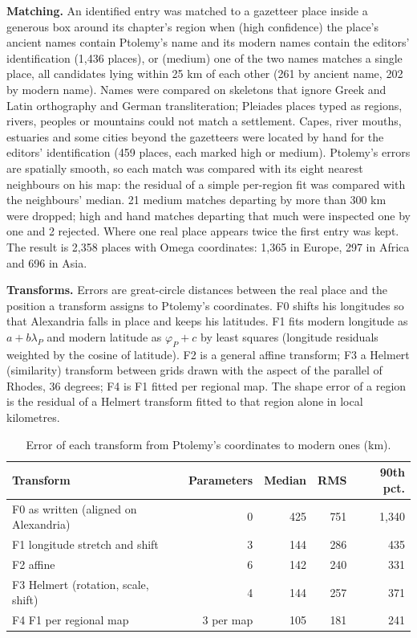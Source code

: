 \documentclass[11pt,a4paper]{article}
\begin{document}
\textbf{Matching.} An identified entry was matched to a gazetteer place inside a generous box around its chapter's region when (high confidence) the place's ancient names contain Ptolemy's name and its modern names contain the editors' identification (1,436 places), or (medium) one of the two names matches a single place, all candidates lying within 25 km of each other (261 by ancient name, 202 by modern name). Names were compared on skeletons that ignore Greek and Latin orthography and German transliteration; Pleiades places typed as regions, rivers, peoples or mountains could not match a settlement. Capes, river mouths, estuaries and some cities beyond the gazetteers were located by hand for the editors' identification (459 places, each marked high or medium). Ptolemy's errors are spatially smooth, so each match was compared with its eight nearest neighbours on his map: the residual of a simple per-region fit was compared with the neighbours' median. 21 medium matches departing by more than 300 km were dropped; high and hand matches departing that much were inspected one by one and 2 rejected. Where one real place appears twice the first entry was kept. The result is 2,358 places with Omega coordinates: 1,365 in Europe, 297 in Africa and 696 in Asia.

\textbf{Transforms.} Errors are great-circle distances between the real place and the position a transform assigns to Ptolemy's coordinates. F0 shifts his longitudes so that Alexandria falls in place and keeps his latitudes. F1 fits modern longitude as $a + b\lambda_P$ and modern latitude as $\varphi_P + c$ by least squares (longitude residuals weighted by the cosine of latitude). F2 is a general affine transform; F3 a Helmert (similarity) transform between grids drawn with the aspect of the parallel of Rhodes, 36 degrees; F4 is F1 fitted per regional map. The shape error of a region is the residual of a Helmert transform fitted to that region alone in local kilometres.

\begin{table}[tbp]\centering\small\caption{Error of each transform from Ptolemy's coordinates to modern ones (km).}\label{tab:fits}\begin{tabular}{lrrrr}\toprule Transform & Parameters & Median & RMS & 90th pct.\\\midrule
F0 as written (aligned on Alexandria) & 0 & 425 & 751 & 1,340\\
F1 longitude stretch and shift & 3 & 144 & 286 & 435\\
F2 affine & 6 & 142 & 240 & 331\\
F3 Helmert (rotation, scale, shift) & 4 & 144 & 257 & 371\\
F4 F1 per regional map & 3 per map & 105 & 181 & 241\\
\bottomrule\end{tabular}\end{table}
\end{document}
